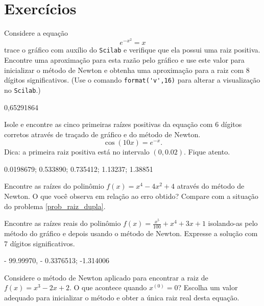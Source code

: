 \section*{Exercícios}

\ifisscilab
\begin{Exercise}\label{new1} Considere a equação
  $$e^{-x^2}=x$$
trace o gráfico com auxílio do \verb+Scilab+ e verifique que ela possui uma raiz positiva. Encontre uma aproximação para esta razão pelo gráfico e use este valor para inicializar o método de Newton e obtenha uma aproximação para a raiz com 8 dígitos significativos. (Use o comando \verb+format('v',16)+ para alterar a visualização no \verb+Scilab+.)
\end{Exercise}
\begin{Answer}
  \begin{tiny}
0,65291864    
  \end{tiny}
\end{Answer}
\fi

\begin{Exercise}\label{new2} Isole e encontre as cinco primeiras raízes positivas da equação com 6 dígitos corretos através de traçado de gráfico e do método de Newton.
$$\cos(10x)=e^{-x}.$$ Dica: a primeira raiz positiva está no intervalo $(0,0.02)$. Fique atento.
\end{Exercise}
\begin{Answer}
 0.0198679; 0.533890; 0.735412; 1.13237; 1.38851
\end{Answer}


\begin{Exercise}\label{new3} Encontre as raízes do polinômio $f(x)=x^4-4x^2+4$ através do método de Newton. O que você observa em relação ao erro obtido? Compare com a situação do problema \ref{prob_raiz_dupla}.
\end{Exercise}

\begin{Exercise}\label{new4} Encontre as raízes reais do polinômio $f(x)=\frac{x^5}{100}+x^4+3x+1$ isolando-as pelo método do gráfico e depois usando o método de Newton. Expresse a solução com 7 dígitos significativos.
\end{Exercise}
\begin{Answer}
 - 99.99970, - 0.3376513; -1.314006
\end{Answer}

\begin{Exercise}Considere o método de Newton aplicado para encontrar a raiz de $f(x)=x^3-2x+2$. O que acontece quando $x^{(0)}=0$? Escolha um valor adequado para inicializar o método e obter a única raiz real desta equação.
\end{Exercise}

